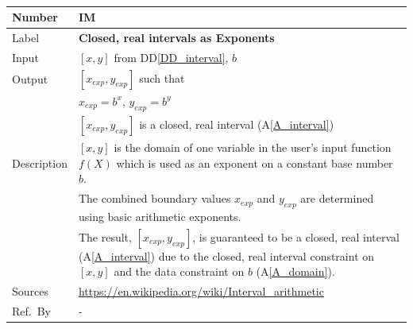 \documentclass[12pt]{article}
\newcommand{\colAwidth}{0.13\textwidth}
\newcommand{\colBwidth}{0.82\textwidth}
\newcommand{\ddref}[1]{DD\ref{#1}}
\newcommand{\aref}[1]{A\ref{#1}}
\newcounter{instnum} %
\begin{document}
~\newline

\noindent
\begin{minipage}{\textwidth}
	\renewcommand*{\arraystretch}{1.5}
	\begin{tabular}{| p{\colAwidth} | p{\colBwidth}|}
		\hline
		\rowcolor[gray]{0.9}
		Number& IM{instnum}\theinstnum \label{I_exponents}\\
		\hline
		Label& \bf  Closed, real intervals as Exponents\\
		\hline
		Input&$[x, y]$ from \ddref{DD_interval}, $b$\\
		\hline
		Output&$[x_{exp}, y_{exp}]$ such that\\
		&$x_{exp} = b^x$, $y_{exp} = b^y$\\
		&$[x_{exp}, y_{exp}]$ is a closed, real interval (\aref{A_interval}) \\
		\hline
		Description&$[x, y]$ is the domain of one variable in the user's input 
		function $f(X)$ which is used as an exponent on a constant base number 
		$b$. \\
		&The combined boundary values $x_{exp}$ and  $y_{exp}$ are determined 
		using basic arithmetic exponents.\\
		& The result, $[x_{exp}, y_{exp}]$, is guaranteed to be a closed, real 
		interval (\aref{A_interval}) due to the closed, real interval 
		constraint on $[x, y]$ and the data constraint on $b$ (\aref{A_domain}).
		\\
		\hline
		Sources& \url{https://en.wikipedia.org/wiki/Interval_arithmetic} \\
		\hline
		Ref.\ By & -\\
		\hline
	\end{tabular}
\end{minipage}\\

~\newline
\end{document}
